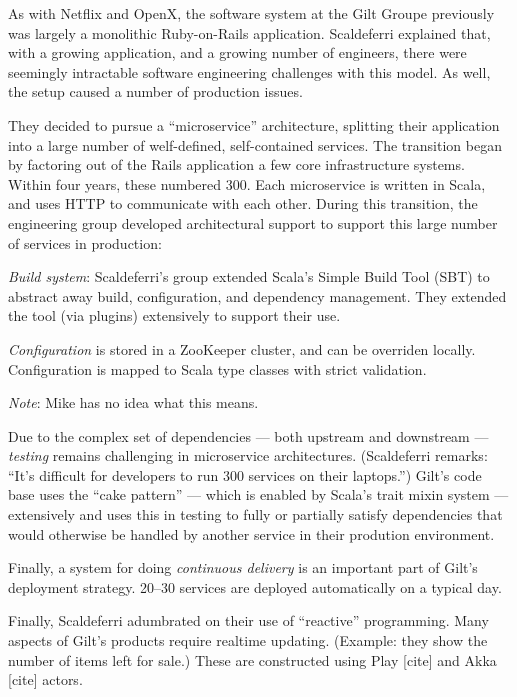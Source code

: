 \documentclass{jfp1}
\newenvironment{ipar}[0]%
 {\begin{list}{}%
 {\setlength{\leftmargin}{1cm}}%
\item[]%
 }
 {\end{list}}
\newcommand\needcite{{\color{red} [cite]}\xspace}
\newcommand{\note}[1]{ \begin{ipar}  {\color{Gray} \textit{Note}: #1} \end{ipar}}
\begin{document}
As with Netflix and OpenX, the software system at the Gilt Groupe
previously was largely a monolithic Ruby-on-Rails application.
Scaldeferri explained that, with a growing
application, and a growing number of engineers, there were seemingly
intractable software engineering challenges with this model. As well,
the setup caused a number of production issues.

They decided to pursue a ``microservice'' architecture, splitting
their application into a large number of welf-defined, self-contained
services. The transition began by factoring out of the Rails
application a few core infrastructure systems. Within four years,
these numbered 300. Each microservice is written in Scala, and uses
HTTP to communicate with each other. During this transition, the
engineering group developed architectural support to support this
large number of services in production:

\begin{itemize}

\item \textit{Build system}: Scaldeferri's group extended Scala's 
Simple Build Tool (SBT) to abstract away build, configuration, and 
dependency management. They extended the tool (via plugins)
extensively to support their use.

\item \textit{Configuration} is stored in a ZooKeeper cluster, and
can be overriden locally. Configuration is mapped to Scala
type classes with strict validation. \note{Mike has no idea what this means.}

\item Due to the complex set of dependencies --- both upstream and
downstream --- \textit{testing} remains challenging in microservice
architectures. (Scaldeferri remarks: ``It's difficult for developers to run 
300 services on their laptops.'') Gilt's code base uses the ``cake pattern'' --- 
which is enabled by Scala's trait mixin system --- extensively and
uses this in testing to fully or partially satisfy dependencies that would
otherwise be handled by another service in their prodution environment.

\item Finally, a system for doing \textit{continuous delivery} is an
important part of Gilt's deployment strategy. 20--30 services are
deployed automatically on a typical day.

\end{itemize}

Finally, Scaldeferri adumbrated on their use of ``reactive''
programming. Many aspects of Gilt's products require realtime
updating. (Example: they show the number of items left for sale.)
These are constructed using Play\needcite and Akka\needcite actors.
\end{document}
